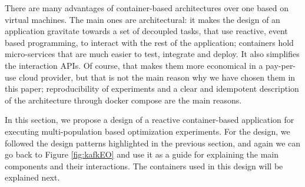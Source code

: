 \documentclass[review]{elsarticle}
\begin{document}
There are many advantages of container-based architectures over one
based on virtual machines. The main ones are architectural: it makes
the design of an application gravitate towards a set of decoupled
tasks, that use reactive, event based programming, to interact with
the rest of the application; containers hold micro-services that are
much easier to test, integrate and deploy. It also simplifies
the interaction APIs. Of course, that makes them more economical in a
pay-per-use cloud provider, but that is not the main reason why we
have chosen them in this paper; reproducibility of experiments and a
clear and idempotent description of the architecture through docker
compose %
are the main reasons. 

In this section, we propose a design of a reactive container-based application
for executing multi-population based optimization experiments.  For the design,
we followed the design patterns highlighted in the previous section, and again
we can go back to Figure \ref{fig:kafkEO} and use it as a guide for explaining
the main components and their interactions. The containers used in this design will be explained next. 



 
\end{document}

